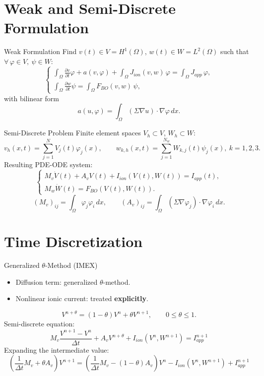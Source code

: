 \documentclass{beamer}
\begin{document}
\section{Weak and Semi-Discrete Formulation}

\begin{frame}{Weak Formulation}
Find $v(t)\in V=H^1(\Omega)$, $w(t)\in W=L^2(\Omega)$ such that $\forall\,\varphi\in V,\ \psi\in W$:
\[
\begin{cases}
\displaystyle\int_\Omega \frac{\partial v}{\partial t}\varphi
 + a(v,\varphi) + \int_\Omega J_{ion}(v,w)\,\varphi = \int_\Omega J_{app}\,\varphi, \\[8pt]
\displaystyle\int_\Omega \frac{\partial w}{\partial t}\psi = \int_\Omega F_{BO}(v,w)\,\psi,
\end{cases}
\]
with bilinear form
\[
a(u,\varphi) = \int_\Omega (\Sigma\nabla u)\cdot\nabla\varphi\,dx.
\]
\end{frame}

\begin{frame}{Semi-Discrete Problem}
Finite element spaces $V_h\subset V$, $W_h\subset W$:
\[
v_h(x,t) = \sum_{j=1}^{N} V_j(t)\varphi_j(x), \qquad
w_{k,h}(x,t) = \sum_{j=1}^{N_w} W_{k,j}(t)\psi_j(x),\ k=1,2,3.
\]
Resulting PDE-ODE system:
\[
\begin{cases}
M_v\dot V(t) + A_v V(t) + I_{ion}(V(t),W(t)) = I_{app}(t), \\
M_w \dot W(t) = F_{BO}(V(t),W(t)).
\end{cases}
\]
\[
(M_v)_{ij} = \int_\Omega \varphi_j\varphi_i\,dx,\qquad
(A_v)_{ij} = \int_\Omega (\Sigma\nabla\varphi_j)\cdot\nabla\varphi_i\,dx.
\]
\end{frame}

\section{Time Discretization}

\begin{frame}{Generalized $\theta$-Method (IMEX)}
\begin{itemize}
  \item Diffusion term: generalized $\theta$-method.
  \item Nonlinear ionic current: treated \textbf{explicitly}.
\end{itemize}
\[
V^{n+\theta} = (1-\theta)V^n + \theta V^{n+1}, \qquad 0\le\theta\le 1.
\]
Semi-discrete equation:
\[
M_v\frac{V^{n+1}-V^n}{\Delta t} + A_v V^{n+\theta} + I_{ion}(V^n,W^{n+1}) = I_{app}^{n+1}
\]
Expanding the intermediate value:
{\small
\[
\left(\frac{1}{\Delta t}M_v + \theta A_v\right)V^{n+1} =
\left(\frac{1}{\Delta t}M_v - (1-\theta)A_v\right)V^n - I_{ion}(V^n,W^{n+1}) + I_{app}^{n+1}
\]
}
\end{frame}
\end{document}
